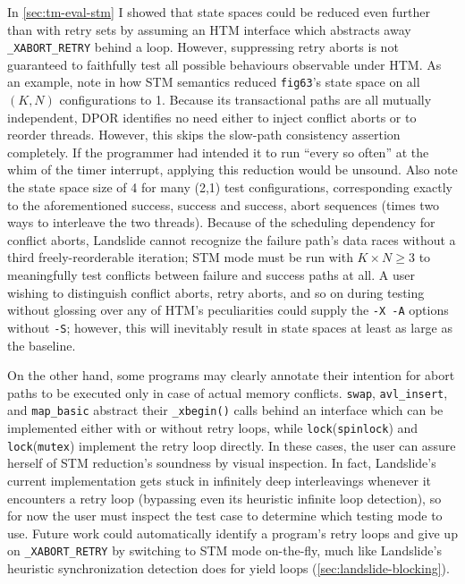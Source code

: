 In \cref{sec:tm-eval-stm} I showed that state spaces could be reduced even further than with retry sets
by assuming an HTM interface which abstracts away {\tt \_XABORT\_RETRY} behind a loop.
However, suppressing retry aborts is not guaranteed to faithfully test all possible behaviours
observable under HTM.
As an example, note in 
how STM semantics reduced %
{\tt fig63}'s state space on all $(K,N)$ configurations to 1.
Because its transactional paths are all mutually independent,
DPOR identifies no need either to inject conflict aborts or to reorder threads.
However, this skips the slow-path consistency assertion completely.
If the programmer had intended it to run ``every so often'' at the whim of the timer interrupt,
applying this reduction would be unsound.
Also note the state space size of 4 for many (2,1) test configurations,
corresponding exactly to the aforementioned success, success and success, abort sequences
(times two ways to interleave the two threads).
Because of the scheduling dependency for conflict aborts,
Landslide cannot recognize the failure path's data races
without a third freely-reorderable iteration;
STM mode must be run with $K \times N \ge 3$ to meaningfully test conflicts between failure and success paths at all.
A user wishing to distinguish conflict aborts, retry aborts, and so on during testing
without glossing over any of HTM's peculiarities
could supply the {\tt -X -A} options without {\tt -S};
however, this will inevitably result in state spaces at least as large as the baseline.

On the other hand, some programs may clearly annotate their intention
for abort paths to be executed only in case of actual memory conflicts.
{\tt swap}, {\tt avl\_insert}, and {\tt map\_basic} abstract their {\tt \_xbegin()} calls
behind an interface which can be implemented either with or without retry loops,
while {\tt lock}({\tt spinlock}) and {\tt lock}({\tt mutex}) implement the retry loop directly.
In these cases, the user can assure herself of STM reduction's soundness by visual inspection.
In fact, Landslide's current implementation gets stuck in infinitely deep interleavings
whenever it encounters a retry loop
(bypassing even its heuristic infinite loop detection),
so for now the user must inspect the test case to determine which testing mode to use.
Future work could automatically identify a program's retry loops
and give up on {\tt \_XABORT\_RETRY} by switching to STM mode on-the-fly,
much like Landslide's heuristic synchronization detection does for yield loops (\cref{sec:landslide-blocking}).

